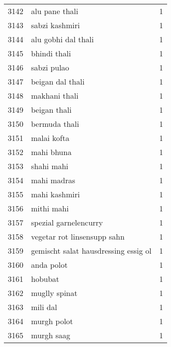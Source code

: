 \begin{tabular}{llr}
3142 &                                     alu pane thali &      1 \\
3143 &                                     sabzi kashmiri &      1 \\
3144 &                                alu gobhi dal thali &      1 \\
3145 &                                       bhindi thali &      1 \\
3146 &                                        sabzi pulao &      1 \\
3147 &                                   beigan dal thali &      1 \\
3148 &                                      makhani thali &      1 \\
3149 &                                       beigan thali &      1 \\
3150 &                                      bermuda thali &      1 \\
3151 &                                        malai kofta &      1 \\
3152 &                                         mahi bhuna &      1 \\
3153 &                                         shahi mahi &      1 \\
3154 &                                        mahi madras &      1 \\
3155 &                                      mahi kashmiri &      1 \\
3156 &                                         mithi mahi &      1 \\
3157 &                              spezial garnelencurry &      1 \\
3158 &                        vegetar rot linsensupp sahn &      1 \\
3159 &               gemischt salat hausdressing essig ol &      1 \\
3160 &                                         anda polot &      1 \\
3161 &                                            hobubat &      1 \\
3162 &                                      muglly spinat &      1 \\
3163 &                                           mili dal &      1 \\
3164 &                                        murgh polot &      1 \\
3165 &                                         murgh saag &      1 \\

\end{tabular}
